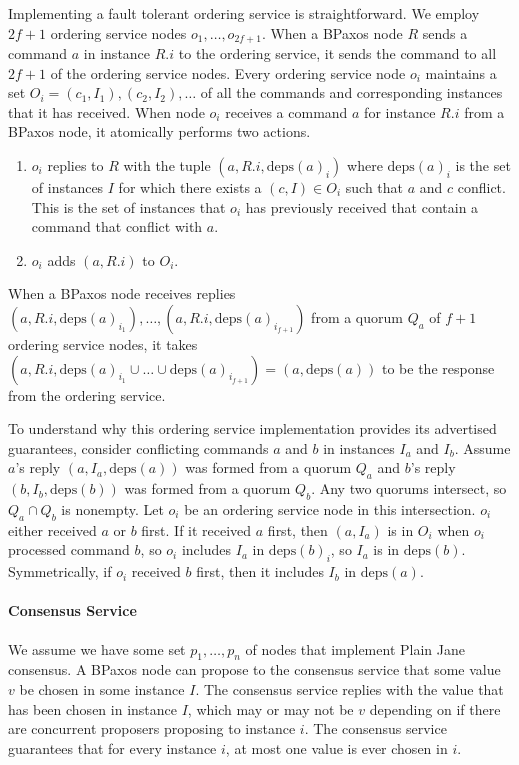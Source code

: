 \documentclass{mwhittaker}
\theoremstyle{definition}
\newcommand{\deps}[1]{\text{deps}(#1)}
\begin{document}
Implementing a fault tolerant ordering service is straightforward. We employ
$2f + 1$ ordering service nodes $o_{1}, \ldots, o_{2f + 1}$. When a BPaxos node
$R$ sends a command $a$ in instance $R.i$ to the ordering service, it sends the
command to all $2f + 1$ of the ordering service nodes. Every ordering service
node $o_i$ maintains a set $O_i = {(c_1, I_1), (c_2, I_2), \ldots}$ of all the
commands and corresponding instances that it has received. When node $o_i$
receives a command $a$ for instance $R.i$ from a BPaxos node, it atomically
performs two actions.
\begin{enumerate}
  \item
    $o_i$ replies to $R$ with the tuple $(a, R.i, \deps{a}_i)$ where
    $\deps{a}_i$ is the set of instances $I$ for which there exists a $(c, I)
    \in O_i$ such that $a$ and $c$ conflict. This is the set of instances that
    $o_i$ has previously received that contain a command that conflict with
    $a$.

  \item
    $o_i$ adds $(a, R.i)$ to $O_i$.
\end{enumerate}

When a BPaxos node receives replies $(a, R.i, \deps{a}_{i_1}), \ldots, (a, R.i,
\deps{a}_{i_{f+1}})$ from a quorum $Q_a$ of $f + 1$ ordering service nodes, it
takes $(a, R.i, \deps{a}_{i_1} \cup \ldots \cup \deps{a}_{i_{f+1}}) = (a,
\deps{a})$ to be the response from the ordering service.

To understand why this ordering service implementation provides its advertised
guarantees, consider conflicting commands $a$ and $b$ in instances $I_a$ and
$I_b$. Assume $a$'s reply $(a, I_a, \deps{a})$ was formed from a quorum $Q_a$
and $b$'s reply $(b, I_b, \deps{b})$ was formed from a quorum $Q_b$. Any two
quorums intersect, so $Q_a \cap Q_b$ is nonempty. Let $o_i$ be an ordering
service node in this intersection. $o_i$ either received $a$ or $b$ first. If
it received $a$ first, then $(a, I_a)$ is in $O_i$ when $o_i$ processed command
$b$, so $o_i$ includes $I_a$ in $\deps{b}_i$, so $I_a$ is in $\deps{b}$.
Symmetrically, if $o_i$ received $b$ first, then it includes $I_b$ in
$\deps{a}$.

\paragraph{Consensus Service}
We assume we have some set $p_1, \ldots, p_n$ of nodes that implement Plain
Jane consensus. A BPaxos node can propose to the consensus service that some
value $v$ be chosen in some instance $I$. The consensus service replies with
the value that has been chosen in instance $I$, which may or may not be $v$
depending on if there are concurrent proposers proposing to instance $i$. The
consensus service guarantees that for every instance $i$, at most one value is
ever chosen in $i$.
\end{document}
